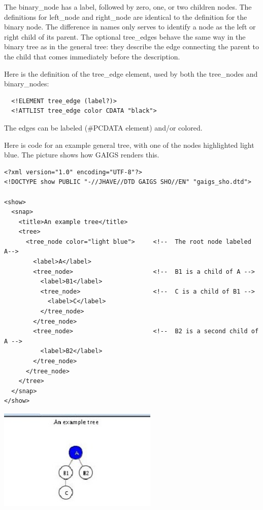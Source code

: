 \documentclass[11pt,letterpaper]{book}
\begin{document}
The binary\_node has a label, followed by zero, one, or two children
nodes. The definitions for left\_node and right\_node are identical to
the definition for the binary node. The difference in names only
serves to identify a node as the left or right child of its parent.
The optional tree\_edges behave the same way in the binary tree as in
the general tree: they describe the edge connecting the parent to the
child that comes immediately before the description.

Here is the definition of the tree\_edge element, used by both the
tree\_nodes and binary\_nodes:

\footnotesize \begin{verbatim}
  <!ELEMENT tree_edge (label?)>
  <!ATTLIST tree_edge color CDATA "black">
\end{verbatim} \normalsize

The edges can be labeled (\#PCDATA element) and/or colored.

Here is code for an example general tree, with one of the nodes
highlighted light blue. The picture shows how GAIGS renders this.

\footnotesize \begin{verbatim}
<?xml version="1.0" encoding="UTF-8"?>
<!DOCTYPE show PUBLIC "-//JHAVE//DTD GAIGS SHO//EN" "gaigs_sho.dtd">

<show>
  <snap>
    <title>An example tree</title>
    <tree>
      <tree_node color="light blue">     <!--  The root node labeled A-->
        <label>A</label>
        <tree_node>                      <!--  B1 is a child of A -->
          <label>B1</label>
          <tree_node>                    <!--  C is a child of B1 -->
            <label>C</label>
          </tree_node>
        </tree_node>
        <tree_node>                      <!--  B2 is a second child of A -->
          <label>B2</label>
        </tree_node>
      </tree_node>
    </tree>
  </snap>
</show>
\end{verbatim} \normalsize


\begin{center}
  \includegraphics[width=3in]{howto_graphics/generaltree.eps}
\end{center}
\end{document}
